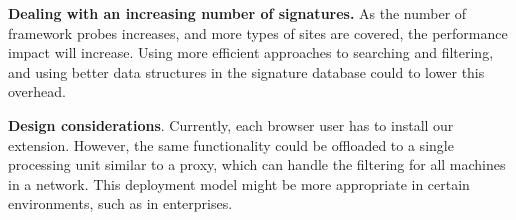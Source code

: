 
\textbf{Dealing with an increasing number of signatures.} As the number of framework probes increases, and more types of sites are covered, the performance impact will increase. Using more efficient approaches to searching and filtering, and using better data structures in the signature database could to lower this overhead.


\textbf{Design considerations}. Currently, each browser user has to install our extension. However, the same functionality could be offloaded to a single processing unit similar to a proxy, which can handle the filtering for all machines in a network. This deployment model might be more appropriate in certain environments, such as in enterprises.


